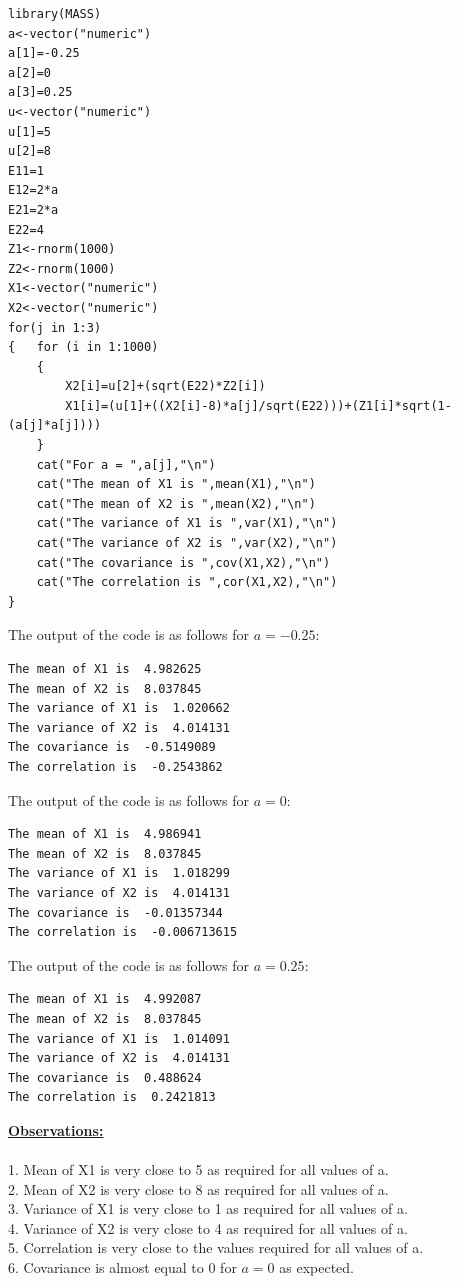 \documentclass[12pt]{book}
\begin{document}
\begin{lstlisting}
library(MASS)
a<-vector("numeric")
a[1]=-0.25
a[2]=0
a[3]=0.25
u<-vector("numeric")
u[1]=5
u[2]=8
E11=1
E12=2*a
E21=2*a
E22=4
Z1<-rnorm(1000)
Z2<-rnorm(1000)
X1<-vector("numeric")
X2<-vector("numeric")
for(j in 1:3)
{	for (i in 1:1000)
	{
		X2[i]=u[2]+(sqrt(E22)*Z2[i])
		X1[i]=(u[1]+((X2[i]-8)*a[j]/sqrt(E22)))+(Z1[i]*sqrt(1-(a[j]*a[j])))
	}
	cat("For a = ",a[j],"\n")
	cat("The mean of X1 is ",mean(X1),"\n")
	cat("The mean of X2 is ",mean(X2),"\n")
	cat("The variance of X1 is ",var(X1),"\n")
	cat("The variance of X2 is ",var(X2),"\n")
	cat("The covariance is ",cov(X1,X2),"\n")
	cat("The correlation is ",cor(X1,X2),"\n")
}
\end{lstlisting}
\newpage
The output of the code is as follows for $a=-0.25$:
\begin{lstlisting}
The mean of X1 is  4.982625 
The mean of X2 is  8.037845 
The variance of X1 is  1.020662 
The variance of X2 is  4.014131 
The covariance is  -0.5149089 
The correlation is  -0.2543862 
\end{lstlisting}

The output of the code is as follows for $a=0$:
\begin{lstlisting}
The mean of X1 is  4.986941 
The mean of X2 is  8.037845 
The variance of X1 is  1.018299 
The variance of X2 is  4.014131 
The covariance is  -0.01357344 
The correlation is  -0.006713615 
\end{lstlisting}

The output of the code is as follows for $a=0.25$:
\begin{lstlisting}
The mean of X1 is  4.992087 
The mean of X2 is  8.037845 
The variance of X1 is  1.014091 
The variance of X2 is  4.014131 
The covariance is  0.488624 
The correlation is  0.2421813 
\end{lstlisting}
\textbf{\underline{Observations:}}\\\\
1. Mean of X1 is very close to 5 as required for all values of a.\\
2. Mean of X2 is very close to 8 as required for all values of a.\\
3. Variance of X1 is very close to 1 as required for all values of a.\\
4. Variance of X2 is very close to 4 as required for all values of a.\\
5. Correlation is very close to the values required for all values of a.\\
6. Covariance is almost equal to 0 for $a=0$ as expected.
\end{document}
